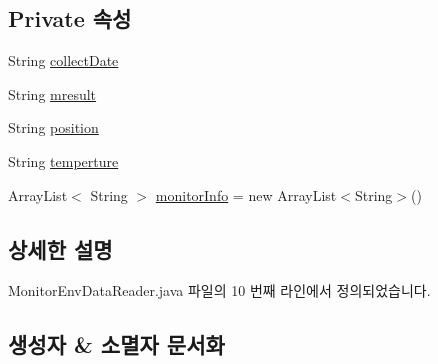 \subsection*{Private 속성}
\begin{DoxyCompactItemize}
\item 
String \mbox{\hyperlink{classcom_1_1github_1_1aites_1_1shlocalaites_1_1gkconnect_1_1_monitor_env_data_reader_ab0434b101af5a74c787e1e7c8b9df81e}{collect\+Date}}
\item 
String \mbox{\hyperlink{classcom_1_1github_1_1aites_1_1shlocalaites_1_1gkconnect_1_1_monitor_env_data_reader_aceba2cce498deeead5798219162147bc}{mresult}}
\item 
String \mbox{\hyperlink{classcom_1_1github_1_1aites_1_1shlocalaites_1_1gkconnect_1_1_monitor_env_data_reader_afbb828e9830818c15c75f55a1cd2a4c2}{position}}
\item 
String \mbox{\hyperlink{classcom_1_1github_1_1aites_1_1shlocalaites_1_1gkconnect_1_1_monitor_env_data_reader_a170a0388500cd344f4cb2f070552b36f}{temperture}}
\item 
Array\+List$<$ String $>$ \mbox{\hyperlink{classcom_1_1github_1_1aites_1_1shlocalaites_1_1gkconnect_1_1_monitor_env_data_reader_a2a0b6633468a372d73ed1ee87e37363a}{monitor\+Info}} = new Array\+List$<$String$>$()
\end{DoxyCompactItemize}


\subsection{상세한 설명}


Monitor\+Env\+Data\+Reader.\+java 파일의 10 번째 라인에서 정의되었습니다.



\subsection{생성자 \& 소멸자 문서화}
\mbox{\label{classcom_1_1github_1_1aites_1_1shlocalaites_1_1gkconnect_1_1_monitor_env_data_reader_a9367b5b2a3621ea42b00639af1d1b9c7}} 
